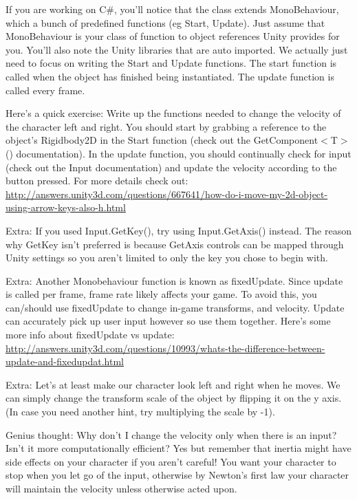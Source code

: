 \documentclass[12pt]{article}
\begin{document}
If you are working on C\#, you'll notice that the class extends MonoBehaviour, which a bunch of predefined functions (eg Start, Update). Just assume that MonoBehaviour is your class of function to object references Unity provides for you. You'll also note the Unity libraries that are auto imported. We actually just need to focus on writing the Start and Update functions. The start function is called when the object has finished being instantiated. The update function is called every frame.

\newpage

Here's a quick exercise: Write up the functions needed to change the velocity of the character left and right. You should start by grabbing a reference to the object's Rigidbody2D in the Start function (check out the GetComponent$<$T$>$() documentation). In the update function, you should continually check for input (check out the Input documentation) and update the velocity according to the button pressed. For more details check out: \url{http://answers.unity3d.com/questions/667641/how-do-i-move-my-2d-object-using-arrow-keys-also-h.html}

Extra: If you used Input.GetKey(), try using Input.GetAxis() instead. The reason why GetKey isn't preferred is because GetAxis controls can be mapped through Unity settings so you aren't limited to only the key you chose to begin with.

Extra: Another Monobehaviour function is known as fixedUpdate. Since update is called per frame, frame rate likely affects your game. To avoid this, you can/should use fixedUpdate to change in-game transforms, and velocity. Update can accurately pick up user input however so use them together. Here's some more info about fixedUpdate vs update: \url{http://answers.unity3d.com/questions/10993/whats-the-difference-between-update-and-fixedupdat.html}

Extra: Let's at least make our character look left and right when he moves. We can simply change the transform scale of the object by flipping it on the y axis. (In case you need another hint, try multiplying the scale by -1).

Genius thought: Why don't I change the velocity only when there is an input? Isn't it more computationally efficient? Yes but remember that inertia might have side effects on your character if you aren't careful! You want your character to stop when you let go of the input, otherwise by Newton's first law your character will maintain the velocity unless otherwise acted upon.
\end{document}

